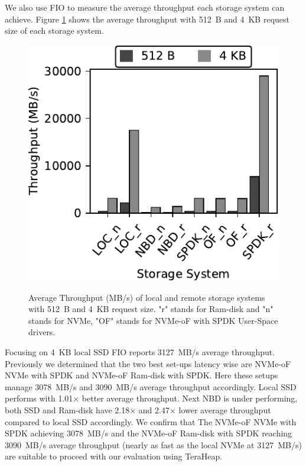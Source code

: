 We also use FIO to measure the average throughput each storage system can achieve. Figure \ref{fig:fio_th} shows the average throughput with \SI{512}{B} and \SI{4}{KB} request size of each storage system. 
\begin{figure}[h]
  \includegraphics[width=\linewidth]{figures/fio_th.pdf}\\
\caption{Average Throughput (MB/s) of local and remote storage systems with \SI{512}{B} and \SI{4}{KB} request size. "r" stands for Ram-disk and "n" stands for NVMe, "OF" stands for NVMe-oF with SPDK User-Space drivers.}
\label{fig:fio_th}
\end{figure}
Focusing on \SI{4}{KB} local SSD FIO reports \SI{3127}{MB/s} average throughput. Previously we determined that the two best set-ups latency wise are NVMe-oF NVMe with SPDK and NVMe-oF Ram-disk with SPDK. Here these setups manage \SI{3078}{MB/s} and \SI{3090}{MB/s} average throughput accordingly. Local SSD performs with 1.01$\times$ better average throughput. Next NBD is under performing, both SSD and Ram-disk have 2.18$\times$ and 2.47$\times$ lower average throughput compared to local SSD accordingly. We confirm that The NVMe-oF NVMe with SPDK achieving \SI{3078}{MB/s} and the
NVMe-oF Ram-disk with SPDK reaching \SI{3090}{MB/s} average throughput (nearly as fast
as the local NVMe at \SI{3127}{MB/s}) are suitable to proceed with our
evaluation using TeraHeap.

